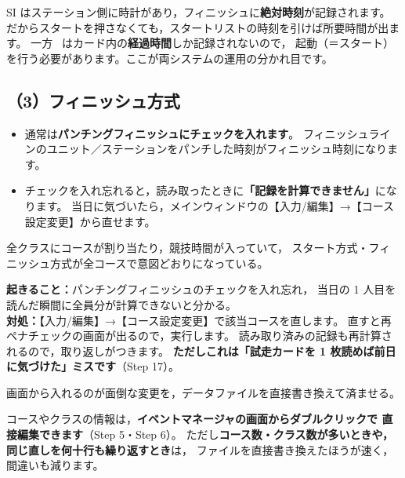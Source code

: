 \begin{Note}
SI はステーション側に時計があり，フィニッシュに\textbf{絶対時刻}が記録されます。
だからスタートを押さなくても，スタートリストの時刻を引けば所要時間が出ます。
一方 \tEMIT\ はカード内の\textbf{経過時間}しか記録されないので，
起動（＝スタート）を行う必要があります。ここが両システムの運用の分かれ目です。
\end{Note}

\subsection*{（3）フィニッシュ方式}

\begin{itemize}
\item 通常は\textbf{パンチングフィニッシュにチェックを入れます}。
      フィニッシュラインのユニット／ステーションをパンチした時刻がフィニッシュ時刻になります。
\item チェックを入れ忘れると，読み取ったときに\textbf{「記録を計算できません」}になります。
      当日に気づいたら，メインウィンドウの【入力/編集】→【コース設定変更】から直せます。
\end{itemize}

\begin{Done}
全クラスにコースが割り当たり，競技時間が入っていて，
スタート方式・フィニッシュ方式が全コースで意図どおりになっている。
\end{Done}

\begin{Fail}
\textbf{起きること：}パンチングフィニッシュのチェックを入れ忘れ，
当日の 1 人目を読んだ瞬間に全員分が計算できないと分かる。\\
\textbf{対処：}【入力/編集】→【コース設定変更】で該当コースを直します。
直すと再ペナチェックの画面が出るので，実行します。
読み取り済みの記録も再計算されるので，取り返しがつきます。
\textbf{ただしこれは「試走カードを 1 枚読めば前日に気づけた」ミスです}（Step 17）。
\end{Fail}


\begin{Goal}
画面から入れるのが面倒な変更を，データファイルを直接書き換えて済ませる。
\end{Goal}

コースやクラスの情報は，\textbf{イベントマネージャの画面からダブルクリックで
直接編集できます}（Step 5・Step 6）。
ただし\textbf{コース数・クラス数が多いときや，同じ直しを何十行も繰り返すとき}は，
ファイルを直接書き換えたほうが速く，間違いも減ります。

